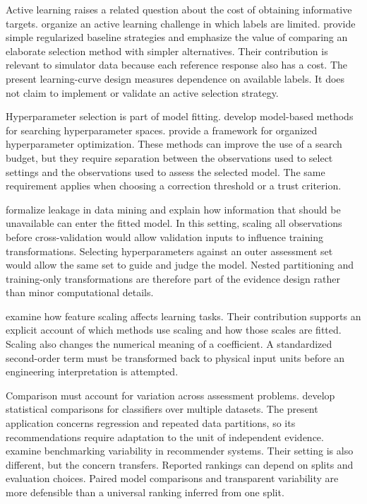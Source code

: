 Active learning raises a related question about the cost of obtaining informative targets. \citet{Guyon2011} organize an active learning challenge in which labels are limited. \citet{Cawley2011} provide simple regularized baseline strategies and emphasize the value of comparing an elaborate selection method with simpler alternatives. Their contribution is relevant to simulator data because each reference response also has a cost. The present learning-curve design measures dependence on available labels. It does not claim to implement or validate an active selection strategy.

Hyperparameter selection is part of model fitting. \citet{Bergstra2011} develop model-based methods for searching hyperparameter spaces. \citet{Akiba2019} provide a framework for organized hyperparameter optimization. These methods can improve the use of a search budget, but they require separation between the observations used to select settings and the observations used to assess the selected model. The same requirement applies when choosing a correction threshold or a trust criterion.

\citet{Kaufman2012} formalize leakage in data mining and explain how information that should be unavailable can enter the fitted model. In this setting, scaling all observations before cross-validation would allow validation inputs to influence training transformations. Selecting hyperparameters against an outer assessment set would allow the same set to guide and judge the model. Nested partitioning and training-only transformations are therefore part of the evidence design rather than minor computational details.

\citet{Pinheiro2025} examine how feature scaling affects learning tasks. Their contribution supports an explicit account of which methods use scaling and how those scales are fitted. Scaling also changes the numerical meaning of a coefficient. A standardized second-order term must be transformed back to physical input units before an engineering interpretation is attempted.

Comparison must account for variation across assessment problems. \citet{Demsar2006} develop statistical comparisons for classifiers over multiple datasets. The present application concerns regression and repeated data partitions, so its recommendations require adaptation to the unit of independent evidence. \citet{Shevchenko2024} examine benchmarking variability in recommender systems. Their setting is also different, but the concern transfers. Reported rankings can depend on splits and evaluation choices. Paired model comparisons and transparent variability are more defensible than a universal ranking inferred from one split.

